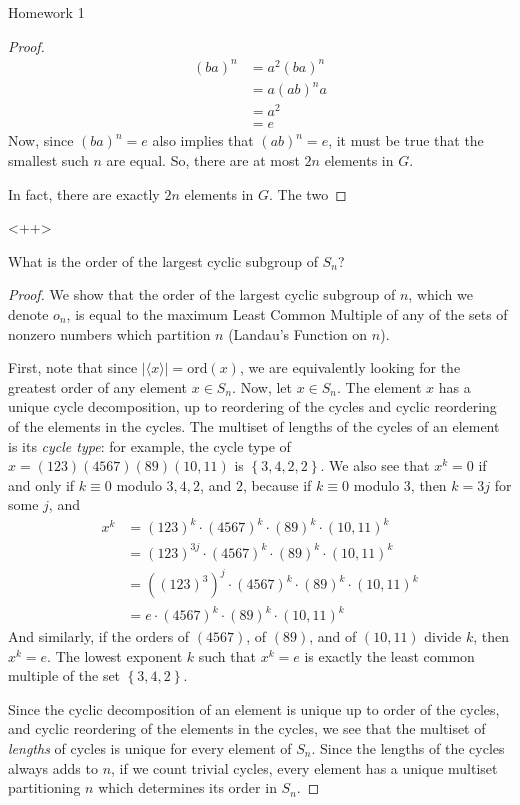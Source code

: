 \documentclass[12pt]{article}
\theoremstyle{definition}
\newenvironment{problem}[2][Problem]{\begin{trivlist}
\item[\hskip \labelsep {\bfseries #1}\hskip \labelsep {\bfseries #2.}]}{\end{trivlist}}
\begin{document}
\begin{section}{Homework 1}
\begin{problem}{1}
\begin{proof}
		\begin{align*}
			(ba)^n &= a^2 (ba)^n\\
			&= a(ab)^n a\\
			&= a^2\\
			&= e
		\end{align*}
		Now, since $(ba)^n = e$ also implies that $(ab)^n =e$, it must be true that the smallest such $n$ are equal. So, there are at most $2n$ elements in $G$.
		\par In fact, there are exactly $2n$ elements in $G$. The two 
	\end{proof}<++>
\end{problem}
\begin{problem}{2}
	What is the order of the largest cyclic subgroup of $S_n$?
	\begin{proof}
		We show that the order of the largest cyclic subgroup of $n$, which we denote $o_n$, is equal to the maximum Least Common Multiple of any of the sets of nonzero numbers which partition $n$ (Landau's Function on $n$).
		\par First, note that since $\left \lvert {  \langle x\rangle } \right \lvert  = \text{ord}(x)$, we are equivalently looking for the greatest order of any element $x \in S_n$. Now, let $x \in S_n$. The element $x$ has a unique cycle decomposition, up to reordering of the cycles and cyclic reordering of the elements in the cycles. The multiset of lengths of the cycles of an element is its \textit{cycle type}: for example, the cycle type of $x = (123)(4567)(89)(10,11)$ is $\left\{ 3,4,2,2 \right\}$. We also see that $x^k = 0$ if and only if $k \equiv 0$ modulo $3,4,2$, and $2$, because if $k \equiv 0$ modulo $3$, then $k = 3j$ for some $j$, and
		\begin{align*}
		    x^k &= (123)^k\cdot (4567)^k \cdot (89)^k \cdot (10,11)^k\\
		    &= (123)^{3j} \cdot (4567)^k \cdot (89)^k \cdot (10,11)^k\\
		    &= ((123)^3)^j\cdot (4567)^k \cdot (89)^k \cdot (10,11)^k\\
		    &= e \cdot (4567)^k \cdot (89)^k \cdot (10,11)^k
		\end{align*}
		And similarly, if the orders of $(4567)$, of $(89)$, and of $(10,11)$ divide $k$, then $x^k = e$. The lowest exponent $k$ such that $x^k = e$ is exactly the least common multiple of the set $\left\{ 3,4,2 \right\}$.
		\par Since the cyclic decomposition of an element is unique up to order of the cycles, and cyclic reordering of the elements in the cycles, we see that the multiset of \textit{lengths} of cycles is unique for every element of $S_n$. Since the lengths of the cycles always adds to $n$, if we count trivial cycles, every element has a unique multiset partitioning $n$ which determines its order in $S_n$. 

\end{proof}
\end{problem}
\end{section}
\end{document}

